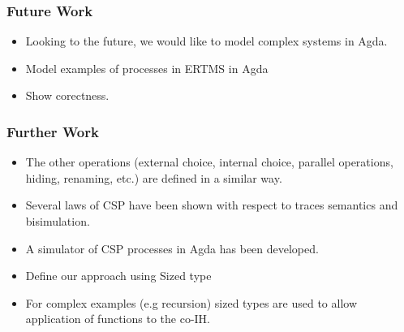 \documentclass{beamer}
\begin{document}
%
%
%
%
%
%
%
%
%

\begin{frame}[fragile] 
\frametitle{Future Work }

\begin{itemize}
\item Looking to the future, we would like to model complex systems in Agda.
\item Model examples of processes in ERTMS in Agda 
\item Show corectness. 
\end{itemize}

	

\end{frame}



\begin{frame}[fragile] 
\frametitle{Further Work }


\begin{itemize}


\item The other operations (external choice, internal choice, parallel operations, hiding, renaming, etc.)
are defined in a similar way.

\item  Several laws of CSP have been shown with respect to traces semantics and bisimulation.

\item A simulator of CSP processes in Agda has been developed. 
 

\item Define our approach using Sized type 

\item For complex examples (e.g recursion) sized types are used to allow application of functions to the co-IH.
\end{itemize}
\end{frame}
\end{document}
